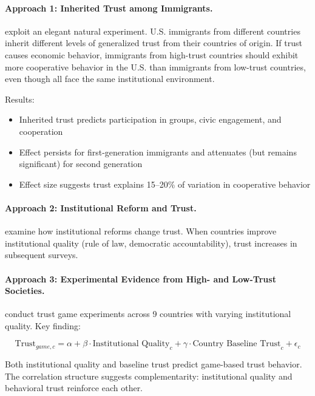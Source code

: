 \documentclass[12pt,oneside]{book}
\begin{document}
\paragraph{Approach 1: Inherited Trust among Immigrants.}

\citet{alganandcahuc2010} exploit an elegant natural experiment. U.S. immigrants from different
countries inherit different levels of generalized trust from their countries of origin. If trust
causes economic behavior, immigrants from high-trust countries should exhibit more cooperative
behavior in the U.S. than immigrants from low-trust countries, even though all face the same
institutional environment.

Results:
\begin{itemize}
  \item Inherited trust predicts participation in groups, civic engagement, and cooperation
  \item Effect persists for first-generation immigrants and attenuates (but remains significant)
        for second generation
  \item Effect size suggests trust explains 15--20\% of variation in cooperative behavior
\end{itemize}

\paragraph{Approach 2: Institutional Reform and Trust.}

\citet{guiso2009} examine how institutional reforms change trust. When countries improve institutional
quality (rule of law, democratic accountability), trust increases in subsequent surveys.

\paragraph{Approach 3: Experimental Evidence from High- and Low-Trust Societies.}

\citet{buchan2009} conduct trust game experiments across 9 countries with varying institutional
quality. Key finding:

\begin{equation}
\text{Trust}_{game, c} = \alpha + \beta \cdot \text{Institutional Quality}_c + \gamma \cdot
\text{Country Baseline Trust}_c + \epsilon_c
\label{eq:trust-institutions}
\end{equation}

Both institutional quality and baseline trust predict game-based trust behavior. The correlation
structure suggests complementarity: institutional quality and behavioral trust reinforce each other.
\end{document}
